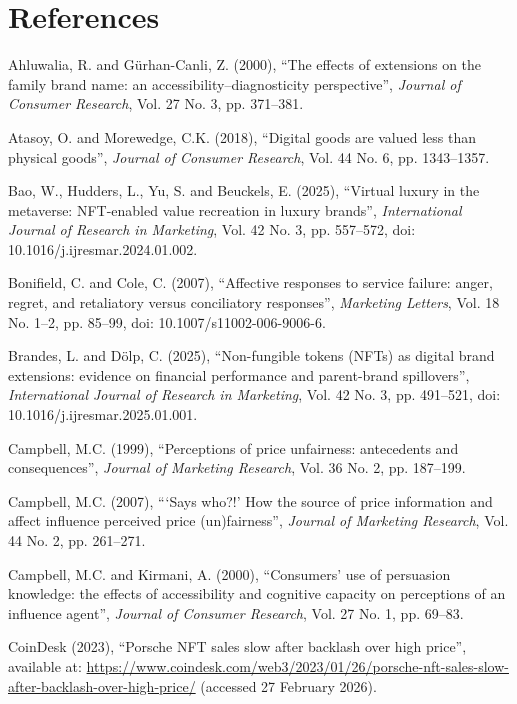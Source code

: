 \documentclass[12pt, a4paper]{article}
\newenvironment{referenceshang}{%
  \par\begingroup
  \setlength{\parindent}{0pt}%
  \setlength{\parskip}{0.5\baselineskip}%
  \everypar{\hangindent=1.5em\hangafter=1\relax}%
  \ignorespaces
}{%
  \par\endgroup
}
\begin{document}
\section*{References}
\begin{referenceshang}

Ahluwalia, R. and G\"urhan-Canli, Z. (2000), ``The effects of extensions on the family brand name: an accessibility--diagnosticity perspective'', \emph{Journal of Consumer Research}, Vol. 27 No. 3, pp. 371--381.

Atasoy, O. and Morewedge, C.K. (2018), ``Digital goods are valued less than physical goods'', \emph{Journal of Consumer Research}, Vol. 44 No. 6, pp. 1343--1357.

Bao, W., Hudders, L., Yu, S. and Beuckels, E. (2025), ``Virtual luxury in the metaverse: NFT-enabled value recreation in luxury brands'', \emph{International Journal of Research in Marketing}, Vol. 42 No. 3, pp. 557--572, doi: 10.1016/j.ijresmar.2024.01.002.

Bonifield, C. and Cole, C. (2007), ``Affective responses to service failure: anger, regret, and retaliatory versus conciliatory responses'', \emph{Marketing Letters}, Vol. 18 No. 1--2, pp. 85--99, doi: 10.1007/s11002-006-9006-6.

Brandes, L. and D\"olp, C. (2025), ``Non-fungible tokens (NFTs) as digital brand extensions: evidence on financial performance and parent-brand spillovers'', \emph{International Journal of Research in Marketing}, Vol. 42 No. 3, pp. 491--521, doi: 10.1016/j.ijresmar.2025.01.001.

Campbell, M.C. (1999), ``Perceptions of price unfairness: antecedents and consequences'', \emph{Journal of Marketing Research}, Vol. 36 No. 2, pp. 187--199.

Campbell, M.C. (2007), ```Says who?!' How the source of price information and affect influence perceived price (un)fairness'', \emph{Journal of Marketing Research}, Vol. 44 No. 2, pp. 261--271.

Campbell, M.C. and Kirmani, A. (2000), ``Consumers' use of persuasion knowledge: the effects of accessibility and cognitive capacity on perceptions of an influence agent'', \emph{Journal of Consumer Research}, Vol. 27 No. 1, pp. 69--83.

CoinDesk (2023), ``Porsche NFT sales slow after backlash over high price'', available at: \url{https://www.coindesk.com/web3/2023/01/26/porsche-nft-sales-slow-after-backlash-over-high-price/} (accessed 27 February 2026).


\end{referenceshang}
\end{document}
